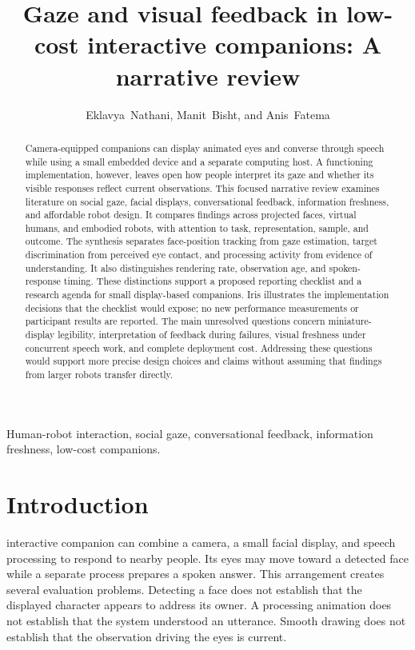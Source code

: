 \documentclass[journal]{IEEEtran}
\begin{document}
\title{Gaze and visual feedback in low-cost interactive companions: A narrative review}
\author{Eklavya~Nathani, Manit~Bisht, and Anis~Fatema}
\maketitle

\begin{abstract}
Camera-equipped companions can display animated eyes and converse through speech while using a small embedded device and a separate computing host. A functioning implementation, however, leaves open how people interpret its gaze and whether its visible responses reflect current observations. This focused narrative review examines literature on social gaze, facial displays, conversational feedback, information freshness, and affordable robot design. It compares findings across projected faces, virtual humans, and embodied robots, with attention to task, representation, sample, and outcome. The synthesis separates face-position tracking from gaze estimation, target discrimination from perceived eye contact, and processing activity from evidence of understanding. It also distinguishes rendering rate, observation age, and spoken-response timing. These distinctions support a proposed reporting checklist and a research agenda for small display-based companions. Iris illustrates the implementation decisions that the checklist would expose; no new performance measurements or participant results are reported. The main unresolved questions concern miniature-display legibility, interpretation of feedback during failures, visual freshness under concurrent speech work, and complete deployment cost. Addressing these questions would support more precise design choices and claims without assuming that findings from larger robots transfer directly.
\end{abstract}

\begin{IEEEkeywords}
Human-robot interaction, social gaze, conversational feedback, information freshness, low-cost companions.
\end{IEEEkeywords}

\section{Introduction}
 interactive companion can combine a camera, a small facial display, and speech processing to respond to nearby people. Its eyes may move toward a detected face while a separate process prepares a spoken answer. This arrangement creates several evaluation problems. Detecting a face does not establish that the displayed character appears to address its owner. A processing animation does not establish that the system understood an utterance. Smooth drawing does not establish that the observation driving the eyes is current.
\end{document}
